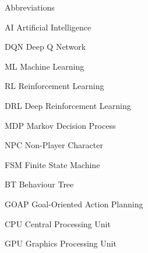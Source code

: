 
\begin{dictionary}{Abbreviations}
\item[AI]	Artificial Intelligence
\item[DQN]	Deep Q Network
\item[ML]	Machine Learning
\item[RL]	Reinforcement Learning
\item[DRL]  Deep Reinforcement Learning
\item[MDP]  Markov Decision Process
\item[NPC]	Non-Player Character
\item[FSM]	Finite State Machine
\item[BT]   Behaviour Tree
\item[GOAP] Goal-Oriented Action Planning
\item[CPU]  Central Processing Unit
\item[GPU]  Graphics Processing Unit
\end{dictionary}
